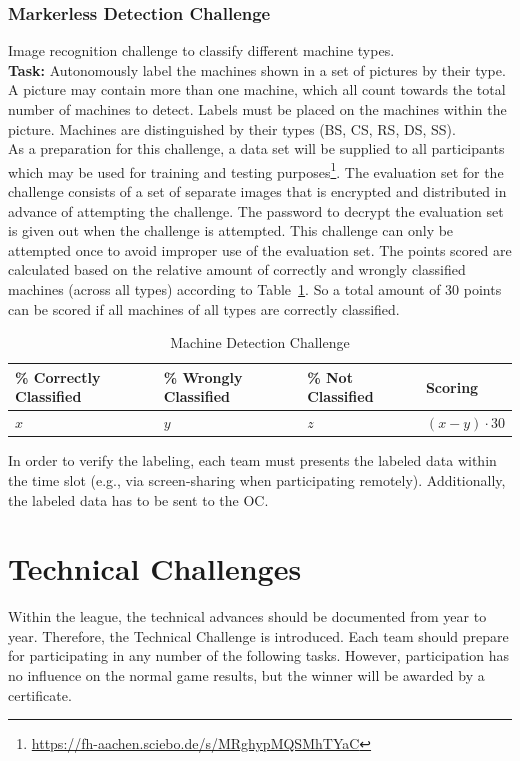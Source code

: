 \documentclass[12pt,twoside]{article}
\newcommand{\reftab}[1]{Table~\ref{#1}}
\begin{document}
\subsubsection{Markerless Detection Challenge}\label{sec:challenge-markerless}
Image recognition challenge to classify different machine types.\\
\textbf{Task:} Autonomously label the machines shown in a set of pictures
by their type.
A picture may contain more than one machine, which all count towards the
total number of machines to detect. Labels must be placed on the machines
within the picture. Machines are distinguished by their types
(BS, CS, RS, \ac{DS}, \ac{SS}).\\
As a preparation for this challenge, a data set will be supplied to
all participants which may be used for training and testing
purposes\footnote{\url{https://fh-aachen.sciebo.de/s/MRghypMQSMhTYaC}}.
The evaluation set for the challenge consists of a set of separate images that
is encrypted and distributed in advance of attempting the challenge.
The password to decrypt the evaluation set is given out when the challenge
is attempted.
This challenge can only be attempted once to avoid improper use of the
evaluation set.
The points scored are calculated based on the relative amount of correctly
and wrongly classified machines (across all types) according to
\reftab{tab:challenge-markerless}. So a total amount of 30 points can be scored
if all machines of all types are correctly classified.
\begin{table}[!htb]
 \centering
 \begin{tabularx}{\linewidth}{l|l|l|l}
  \% Correctly Classified & \% Wrongly Classified & \% Not Classified
  & Scoring \\\hline
  $x$ & $y$ & $z$ & $(x-y)\cdot30$
 \end{tabularx}
 \caption{Machine Detection Challenge}
 \label{tab:challenge-markerless}
\end{table}

In order to verify the labeling, each team must presents the labeled data
within the time slot (e.g., via screen-sharing when participating remotely).
Additionally, the labeled data has to be sent to the \ac{OC}.


\section{Technical Challenges}
\label{sec:technical-challenge}
Within the league, the technical advances should be documented from
year to year. Therefore, the Technical Challenge is introduced. Each
team should prepare for participating in any number of the following
tasks. However, participation has no influence on the normal game
results, but the winner will be awarded by a certificate.
\end{document}
